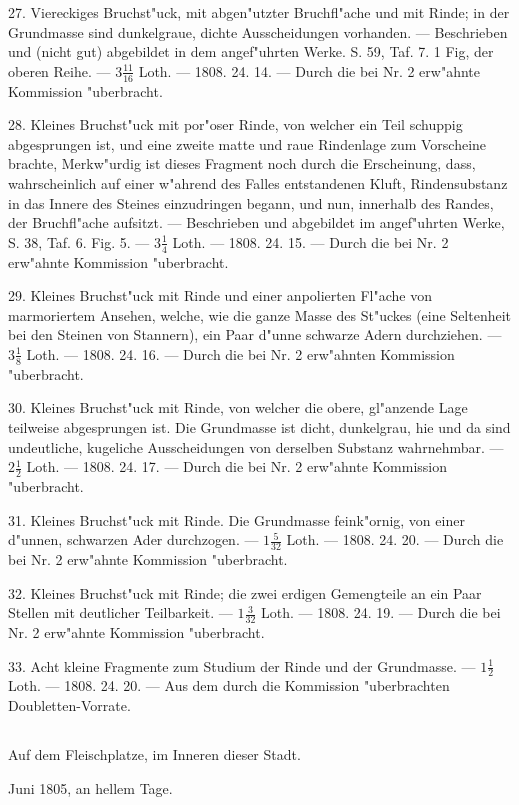\documentclass[a4paper, 11pt, oneside, polutonikogreek, german]{article}
\begin{document}
27. Viereckiges Bruchst"uck, mit abgen"utzter Bruchfl"ache und mit Rinde; in der Grundmasse sind dunkelgraue, dichte Ausscheidungen vorhanden. --- Beschrieben und (nicht gut) abgebildet in dem angef"uhrten Werke. S. 59, Taf. 7. 1 Fig, der oberen Reihe. --- $3\frac{11}{16}$ Loth. --- 1808. 24. 14. --- Durch die bei Nr. 2 erw"ahnte Kommission "uberbracht.

28. Kleines Bruchst"uck mit por"oser Rinde, von welcher ein Teil schuppig abgesprungen ist, und eine zweite matte und raue Rindenlage zum Vorscheine brachte, Merkw"urdig ist dieses Fragment noch durch die Erscheinung, dass, wahrscheinlich auf einer w"ahrend des Falles entstandenen Kluft, Rindensubstanz in das Innere des Steines einzudringen begann, und nun, innerhalb des Randes, der Bruchfl"ache aufsitzt. --- Beschrieben und abgebildet im angef"uhrten Werke, S. 38, Taf. 6. Fig. 5. --- $3\frac{1}{4}$ Loth. --- 1808. 24. 15. --- Durch die bei Nr. 2 erw"ahnte Kommission "uberbracht.

29. Kleines Bruchst"uck mit Rinde und einer anpolierten Fl"ache von marmoriertem Ansehen, welche, wie die ganze Masse des St"uckes (eine Seltenheit bei den Steinen von Stannern), ein Paar d"unne schwarze Adern durchziehen. --- $3\frac{1}{8}$ Loth. --- 1808. 24. 16. --- Durch die bei Nr. 2 erw"ahnten Kommission "uberbracht.

30. Kleines Bruchst"uck mit Rinde, von welcher die obere, gl"anzende Lage teilweise abgesprungen ist. Die Grundmasse ist dicht, dunkelgrau, hie und da sind undeutliche, kugeliche Ausscheidungen von derselben Substanz wahrnehmbar. --- $2\frac{1}{2}$ Loth. --- 1808. 24. 17. --- Durch die bei Nr. 2 erw"ahnte Kommission "uberbracht.

31. Kleines Bruchst"uck mit Rinde. Die Grundmasse feink"ornig, von einer d"unnen, schwarzen Ader durchzogen. --- $1\frac{5}{32}$ Loth. --- 1808. 24. 20. --- Durch die bei Nr. 2 erw"ahnte Kommission "uberbracht.

32. Kleines Bruchst"uck mit Rinde; die zwei erdigen Gemengteile an ein Paar Stellen mit deutlicher Teilbarkeit. --- $1\frac{3}{32}$ Loth. --- 1808. 24. 19. --- Durch die bei Nr. 2 erw"ahnte Kommission "uberbracht.

33. Acht kleine Fragmente zum Studium der Rinde und der Grundmasse. --- $1\frac{1}{2}$ Loth. --- 1808. 24. 20. --- Aus dem durch die Kommission "uberbrachten Doubletten-Vorrate.
\subsection{}
\begin{center}

Auf dem Fleischplatze, im Inneren dieser Stadt.

Juni 1805, an hellem Tage.
\end{center}
\end{document}
